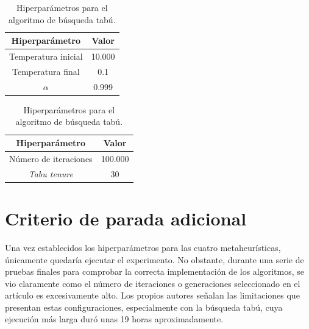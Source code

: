 \begin{table}[H]
    \centering
    \renewcommand{\arraystretch}{1.3}

    \begin{minipage}{0.48\textwidth}
        \centering
        \caption{Hiperparámetros para el algoritmo de recocido simulado.}
        \label{tab:sa_hyperparams}

        \begin{tabular}{|c|c|}
            \hline
            \textbf{Hiperparámetro} & \textbf{Valor} \\
            \hline
            Temperatura inicial & 10.000 \\
            \hline
            Temperatura final & 0.1 \\
            \hline
            $\alpha$ & 0.999 \\
            \hline
        \end{tabular}
    \end{minipage}
    \hfill
    \begin{minipage}{0.48\textwidth}
        \centering
        \caption{Hiperparámetros para el algoritmo de búsqueda tabú.}
        \label{tab:ts_hyperparams}

        \begin{tabular}{|c|c|}
            \hline
            \textbf{Hiperparámetro} & \textbf{Valor} \\
            \hline
            Número de iteraciones & 100.000 \\
            \hline
            \textit{Tabu tenure} & 30 \\
            \hline
        \end{tabular}
    \end{minipage}

\end{table}

\section{Criterio de parada adicional}
\label{sec:stop_crit}

Una vez establecidos los hiperparámetros para las cuatro metaheurísticas, únicamente quedaría ejecutar el experimento. No 
obstante, durante una serie de pruebas finales para comprobar la correcta implementación de los algoritmos, se vio claramente
como el número de iteraciones o generaciones seleccionado en el artículo es excesivamente alto. Los propios autores señalan las
limitaciones que presentan estas configuraciones, especialmente con la búsqueda tabú, cuya ejecución más larga duró unas 19 
horas aproximadamente.

